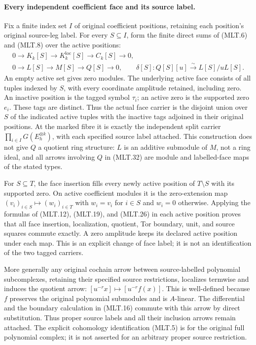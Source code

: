 \paragraph{Every independent coefficient face and its source label.}
Fix a finite index set \(I\) of original
coefficient positions, retaining each position's
original source-leg label. For every
\(S\subseteq I\), form the finite direct sums
of (MLT.6) and (MLT.8) over the active positions:
\[
 \begin{gathered}
 0\to K_k[S]\to K_k^{\mathrm{loc}}[S]\to C_k[S]\to0,\\
 0\to L[S]\to M[S]\to Q[S]\to0,\qquad
 \delta[S]:Q[S][u]\xrightarrow{\sim}L[S]/uL[S].
 \end{gathered}                                           \tag{MLT.32}
\]
An empty active set gives zero modules.
The underlying active face consists of all
tuples indexed by \(S\), with every coordinate
amplitude retained, including zero. An
inactive position is the tagged symbol
\(\tau_i\); an active zero is the supported
zero \(e_i\). These tags are distinct.
Thus the actual face carrier is the
disjoint union over \(S\) of the indicated
active tuples with the inactive tags
adjoined in their original positions.
At the marked fibre it is exactly the
independent split carrier
\(\prod_{i\in I}G(E_h^{\otimes k})\),
with each specified source label attached.
This construction does not give \(Q\)
a quotient ring structure: \(L\) is an
additive submodule of \(M\), not a ring
ideal, and all arrows involving \(Q\)
in (MLT.32) are module and labelled-face
maps of the stated types.

For \(S\subseteq T\), the face insertion
fills every newly active position of
\(T\setminus S\) with its supported zero.
On active coefficient modules it is
the zero-extension map
\((v_i)_{i\in S}\mapsto(w_i)_{i\in T}\)
with \(w_i=v_i\) for \(i\in S\) and
\(w_i=0\) otherwise. Applying the formulas
of (MLT.12), (MLT.19), and (MLT.26)
in each active position proves that all
face insertion, localization, quotient,
Tor boundary, unit, and source squares
commute exactly. A zero amplitude keeps
its declared active position under each
map. This is an explicit change of
face label; it is not an identification
of the two tagged carriers.

More generally any original cochain
arrow between source-labelled polynomial
subcomplexes, retaining their specified
source restrictions, localizes termwise
and induces the quotient arrow:
\([u^{-r}x]\mapsto[u^{-r}f(x)]\).
This is well-defined because \(f\)
preserves the original polynomial
submodules and is \(A\)-linear.
The differential and the boundary
calculation in (MLT.16) commute with
this arrow by direct substitution.
Thus proper source labels and all
their inclusion arrows remain attached.
The explicit cohomology identification
(MLT.5) is for the original full
polynomial complex; it is not
asserted for an arbitrary proper
source restriction.

